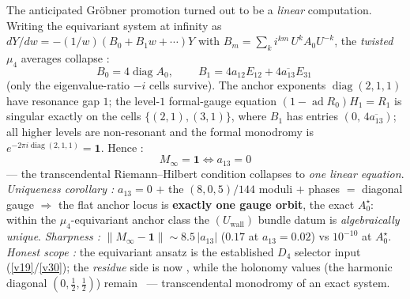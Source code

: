 \begin{keybox}[The resonance theorem: $M_\infty=\mathbf1\iff a_{13}=0$ --- one gauge orbit \mE\ (\veri{v116\_resonance\_uniqueness.py})]
The anticipated Gr\"obner promotion turned out to be a \emph{linear} computation. Writing the
equivariant system at infinity as $dY/dw=-(1/w)(B_0+B_1w+\cdots)Y$ with
$B_m=\sum_k i^{km}\,U^kA_0U^{-k}$, the \emph{twisted} $\mu_4$ averages collapse \mE:
\[
  B_0=4\operatorname{diag}A_0,\qquad
  \boxed{\ B_1=4a_{12}E_{12}+4\overline{a_{13}}E_{31}\ }
\]
(only the eigenvalue-ratio $-i$ cells survive). The anchor exponents $\operatorname{diag}(2,1,1)$ have
resonance gap $1$; the level-$1$ formal-gauge equation $(1-\operatorname{ad}R_0)H_1=R_1$ is singular
exactly on the cells $\{(2,1),(3,1)\}$, where $B_1$ has entries $(0,\,4\overline{a_{13}})$; all higher
levels are non-resonant and the formal monodromy is $e^{-2\pi i\operatorname{diag}(2,1,1)}=\mathbf1$.
Hence \mE:
\[
  \boxed{\ M_\infty=\mathbf1\iff a_{13}=0\ }
\]
--- the transcendental Riemann--Hilbert condition collapses to \emph{one linear equation}.
\emph{Uniqueness corollary \mE:} $a_{13}=0$ $+$ the $(8,0,5)/144$ moduli $+$ phases $=$ diagonal gauge
$\Rightarrow$ the flat anchor locus is \textbf{exactly one gauge orbit}, the exact $A_0^\star$: within
the $\mu_4$-equivariant anchor class the $(U_{\mathrm{wall}})$ bundle datum is \emph{algebraically
unique}. \emph{Sharpness \mE:} $\|M_\infty-\mathbf1\|\sim8.5\,|a_{13}|$ ($0.17$ at $a_{13}=0.02$) vs
$10^{-10}$ at $A_0^\star$. \emph{Honest scope \mC:} the equivariant ansatz is the established $D_4$
selector input (\vref{v19}/\vref{v30}); the \emph{residue} side is now \mE, while the holonomy values (the harmonic
diagonal $(0,\tfrac12,\tfrac12)$) remain \mE\ --- transcendental monodromy of an exact system.
\end{keybox}

